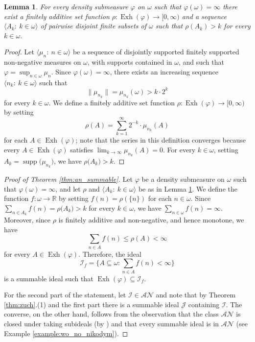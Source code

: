 \documentclass[a4paper,11pt,fleqn]{amsart}
\newtheorem{lemma}[theorem]{Lemma}
\theoremstyle{definition}
\theoremstyle{remark}
\numberwithin{equation}{section}
\newcommand{\N}{\mathbb{N}}
\newcommand{\R}{\mathbb{R}}
\newcommand{\aA}{\mathcal{A}}
\newcommand{\iI}{\mathcal{I}}
\newcommand{\jJ}{\mathcal{J}}
\newcommand{\nN}{\mathcal{N}}
\DeclareMathOperator{\exh}{Exh}
\newcommand{\sub}{\subseteq}
\DeclareMathOperator{\supp}{supp}
\newcommand{\seqn}[1]{\big\langle#1\colon\ n\io\big\rangle}
\newcommand{\seqk}[1]{\big\langle#1\colon\ k\io\big\rangle}
\newcommand{\io}{\in\omega}%
\begin{document}
\begin{lemma}\label{lemma:aN_unbounded_measure}
For every density submeasure $\varphi$ on $\omega$ such that $\varphi(\omega)=\infty$ there exist a finitely additive set function $\rho\colon\exh(\varphi)\to [0,\infty)$ and a sequence $\seqk{A_k}$ of pairwise disjoint finite subsets of $\omega$ such that $\rho(A_k)>k$ for every $k\io$.
\end{lemma}
\begin{proof}
Let $\seqn{\mu_n}$ be a sequence of disjointly supported finitely supported non-negative measures on $\omega$, with supports contained in $\omega$, and such that $\varphi=\sup_{n\io}\mu_n$. Since $\varphi(\omega)=\infty$, there exists an increasing sequence $\seqk{n_k}$ such that
\[\big\|\mu_{n_k}\big\|=\mu_{n_k}(\omega)>k\cdot 2^k\]
for every $k\io$. We define a finitely additive set function $\rho\colon\exh(\varphi)\to[0,\infty)$ by setting
\[ \rho(A) = \sum_{k=1}^{\infty} 2^{-k}\cdot \mu_{n_k}(A)\]
for each $A\in\exh(\varphi)$; note that the series in this definition converges because every $A\in\exh(\varphi)$ satisfies $\lim_{k\to\infty}\mu_{n_k}(A)=0$. For every $k\io$, setting $A_k=\supp\big(\mu_{n_k}\big)$, we have $\rho\big(A_k\big)>k$.
\end{proof}

\begin{proof}[Proof of Theorem \ref{thm:an_summable}]
Let $\varphi$ be a density submeasure on $\omega$ such that $\varphi(\omega)=\infty$, and let $\rho$ and $\seqk{A_k}$ be as in Lemma \ref{lemma:aN_unbounded_measure}. We define the function $f\colon\omega\to\R$ by setting $f(n)=\rho(\{n\})$ for each $n\io$. Since $\sum_{n\in A_k }f(n)=\rho\big(A_k\big)>k$ for every $k\io$, we have $\sum_{n\io}f(n)=\infty$. Moreover, since $\rho$ is finitely additive and non-negative, and hence monotone, we have
\[\sum_{n\in A}f(n)\leq\rho(A)<\infty\]
for every $A\in\exh(\varphi)$. Therefore, the ideal
\[\iI_f=\Big\{A\sub\omega\colon\sum_{n\in A} f(n) < \infty\Big\}\]
is a summable ideal such that $\exh(\varphi)\sub\iI_f$.

\medskip

For the second part of the statement, let $\iI\in\aA\nN$ and note that by Theorem \ref{thm:zuch}.(1) and the first part there is a summable ideal $\jJ$ containing $\iI$. The converse, on the other hand, follows from the observation that the class $\aA\nN$ is closed under taking subideals (by \cite[Proposition 5.2]{Zuc25}) and that every summable ideal is in $\aA\nN$ (see Example \ref{example:wo_no_nikodym}). 
\end{proof}
\end{document}
